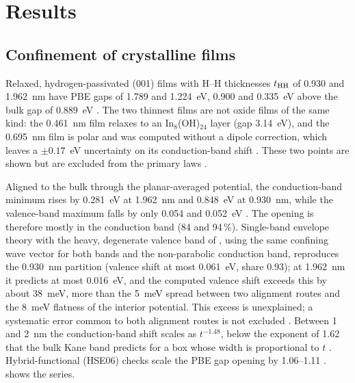 \documentclass[11pt]{article}
\begin{document}
\section{Results}
\label{sec:results}

\subsection{Confinement of crystalline \texorpdfstring{\InO}{In2O3} films}
\label{sec:r-confinement}

Relaxed, hydrogen-passivated \InO{}(001) films with H--H thicknesses $t_{\mathrm{HH}}$ of 0.930 and 1.962~nm have PBE gaps of
1.789 and 1.224~eV, 0.900 and 0.335~eV above the bulk gap of 0.889~eV . The two
thinnest films are not oxide films of the same kind: the 0.461~nm film relaxes to an In$_8$(OH)$_{24}$ layer
(gap 3.14~eV), and the 0.695~nm film is polar and was computed without a dipole correction, which leaves a
$\pm0.17$~eV uncertainty on its conduction-band shift . These two points are shown but are
excluded from the primary laws .

Aligned to the bulk through the planar-averaged potential, the conduction-band minimum rises by 0.281~eV at 1.962~nm
and 0.848~eV at 0.930~nm, while the valence-band maximum falls by only 0.054 and 0.052~eV . The opening is
therefore mostly in the conduction band (84 and 94\,\%). Single-band envelope theory with the heavy, degenerate valence
band of \InO{} , using the same confining wave vector for both bands and the non-parabolic conduction band,
reproduces the 0.930~nm partition (valence shift at most 0.061~eV, share 0.93); at 1.962~nm it predicts at most
0.016~eV, and the computed valence shift exceeds this by about 38~meV, more than the 5~meV spread between two
alignment routes and the 8~meV flatness of the interior potential. This excess is unexplained; a systematic error
common to both alignment routes is not excluded . Between 1 and
2~nm the conduction-band shift scales as $t^{-1.48}$, below the exponent of 1.62 that the bulk Kane band predicts for a
box whose width is proportional to $t$ . Hybrid-functional (HSE06) checks scale the PBE gap opening
by 1.06--1.11 .  shows the series.
\end{document}
